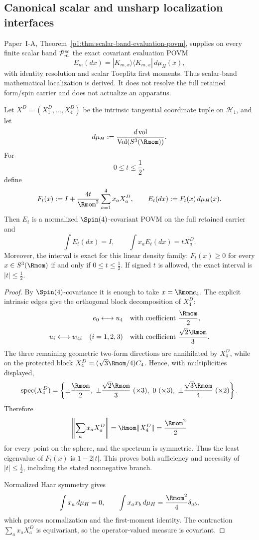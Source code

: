 \documentclass[12pt,a4paper]{article}
\begin{document}
\subsection{Canonical scalar and unsharp localization interfaces}
\label{p2c:sec:canonical-localization-interfaces}

Paper~I-A, Theorem~\ref{p1:thm:scalar-band-evaluation-povm}, supplies on every
finite scalar band \(\mathcal P_m^{\rm sc}\) the exact covariant evaluation
POVM
\[
 E_m(dx)=|K_{m,x}\rangle\langle K_{m,x}|\,d\mu_H(x),
\]
with identity resolution and scalar Toeplitz first moments.  Thus scalar-band
mathematical localization is derived.  It does not resolve the full retained
form/spin carrier and does not actualize an apparatus.

\begin{theorem}
\label{p2c:thm:unsharp-intrinsic-coordinate-povm}
Let \(X^D=(X_1^D,\ldots,X_4^D)\) be the intrinsic tangential coordinate tuple
on \(\mathcal H_1\), and let
\[
 d\mu_H:=\frac{d\operatorname{vol}}
 {\operatorname{Vol}(S^3(\Rmom))}.
\]
For
\[
 0\le t\le\frac12,
\]
define
\[
 F_t(x):=I+\frac{4t}{\Rmom^2}\sum_{a=1}^4x_aX_a^D,
 \qquad
 E_t(dx):=F_t(x)\,d\mu_H(x).
\]
Then \(E_t\) is a normalized \(\Spin(4)\)-covariant POVM on the full retained
carrier and
\[
 \boxed{\int E_t(dx)=I,\qquad
 \int x_aE_t(dx)=tX_a^D.}
\]
Moreover, the interval is exact for this linear density family:
\(F_t(x)\ge0\) for every \(x\in S^3(\Rmom)\) if and only if
\(0\le t\le\frac12\).  If signed \(t\) is allowed, the exact interval is
\(|t|\le\frac12\).
\end{theorem}

\begin{proof}
By \(\Spin(4)\)-covariance it is enough to take
\(x=\Rmom e_4\).  The explicit intrinsic edges give the orthogonal block
decomposition of \(X_4^D\):
\[
 \begin{aligned}
 e_0\longleftrightarrow u_4
 &\quad\text{with coefficient }\frac{\Rmom}{2},\\
 u_i\longleftrightarrow w_{4i}\quad(i=1,2,3)
 &\quad\text{with coefficient }\frac{\sqrt2\Rmom}{3}.
 \end{aligned}
\]
The three remaining geometric two-form directions are annihilated by
\(X_4^D\), while on the protected block
\(X_4^D=(\sqrt3\Rmom/4)C_4\).  Hence, with multiplicities displayed,
\[
 \operatorname{spec}(X_4^D)
 =\left\{
 \pm\frac{\Rmom}{2},\
 \pm\frac{\sqrt2\Rmom}{3}\ (\times3),\
 0\ (\times3),\
 \pm\frac{\sqrt3\Rmom}{4}\ (\times2)
 \right\}.
\]
Therefore
\[
 \left\|\sum_ax_aX_a^D\right\|
 =\Rmom\|X_4^D\|
 =\frac{\Rmom^2}{2}
\]
for every point on the sphere, and the spectrum is symmetric.  Thus the least
eigenvalue of \(F_t(x)\) is \(1-2|t|\).  This proves both sufficiency and
necessity of \(|t|\le\frac12\), including the stated nonnegative branch.

Normalized Haar symmetry gives
\[
 \int x_a\,d\mu_H=0,
 \qquad
 \int x_ax_b\,d\mu_H=\frac{\Rmom^2}{4}\delta_{ab},
\]
which proves normalization and the first-moment identity.  The contraction
\(\sum_ax_aX_a^D\) is equivariant, so the operator-valued measure is
covariant.
\end{proof}
\end{document}
